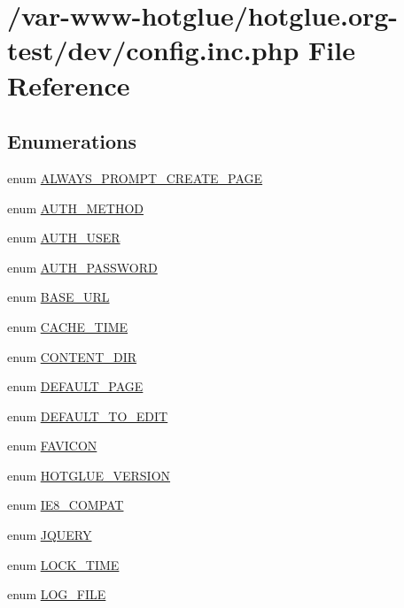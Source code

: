 \hypertarget{config_8inc_8php}{
\section{/var-\/www-\/hotglue/hotglue.org-\/test/dev/config.inc.php File Reference}
\label{config_8inc_8php}
}
\subsection*{Enumerations}
\begin{DoxyCompactItemize}
\item 
enum \hyperlink{config_8inc_8php_af7115c186e2e18cb1839aed9d163b31a}{ALWAYS\_\-PROMPT\_\-CREATE\_\-PAGE} 
\item 
enum \hyperlink{config_8inc_8php_a2ee7e30fa45253c5e303994703d3293f}{AUTH\_\-METHOD} 
\item 
enum \hyperlink{config_8inc_8php_a7d3a74ff015a9f789a5a2e554a9fa956}{AUTH\_\-USER} 
\item 
enum \hyperlink{config_8inc_8php_adf2112da607b39714ba9cca31b42a93a}{AUTH\_\-PASSWORD} 
\item 
enum \hyperlink{config_8inc_8php_a16548ab75ed30cbddce178d56d26dbb8}{BASE\_\-URL} 
\item 
enum \hyperlink{config_8inc_8php_afc454c0433a87811735836800fe3350b}{CACHE\_\-TIME} 
\item 
enum \hyperlink{config_8inc_8php_a9949c9013641bf07cd112607d200d6ff}{CONTENT\_\-DIR} 
\item 
enum \hyperlink{config_8inc_8php_a4208e17d37801abf0982b2d1e625a8f2}{DEFAULT\_\-PAGE} 
\item 
enum \hyperlink{config_8inc_8php_a3b22c0132666a0112334ed38a21de8ce}{DEFAULT\_\-TO\_\-EDIT} 
\item 
enum \hyperlink{config_8inc_8php_afd55d95ee6651060397404533516882a}{FAVICON} 
\item 
enum \hyperlink{config_8inc_8php_a7c35565a4692ae46fd1c04340f4f1ca9}{HOTGLUE\_\-VERSION} 
\item 
enum \hyperlink{config_8inc_8php_a1d76a949b348522c90864da5df468d51}{IE8\_\-COMPAT} 
\item 
enum \hyperlink{config_8inc_8php_a5c2fff7e41a0380fb7872627e3a14a29}{JQUERY} 
\item 
enum \hyperlink{config_8inc_8php_a924ae40271cc363050158e36b3823407}{LOCK\_\-TIME} 
\item 
enum \hyperlink{config_8inc_8php_a6de83433b64b24349644a4c2d839dcb7}{LOG\_\-FILE} 

\end{DoxyCompactItemize}
